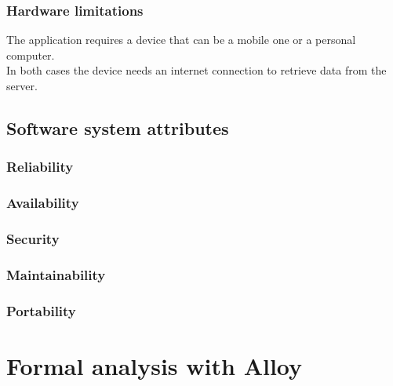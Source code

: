 \documentclass[12pt, a4paper]{report}
\begin{document}
        \subsection{Hardware limitations}
        The application requires a device that can be a mobile one or a personal computer. \\
        In both cases the device needs an internet connection to retrieve data from the server. 

    \section{Software system attributes}
        \subsection{Reliability}
        \subsection{Availability}
        \subsection{Security}
        \subsection{Maintainability}
        \subsection{Portability}

\newpage 

\chapter{Formal analysis with Alloy}

\newpage 
\end{document}
